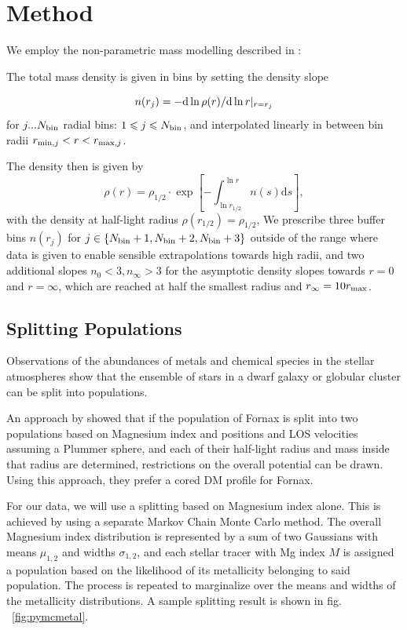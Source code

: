 \section{Method}\label{sec:method}
We employ the non-parametric mass modelling described in
:

The total mass density is given in bins by setting the density slope

\begin{equation}
n(r_j)=-{\rm d}\ln\rho(r)/{\rm d}\ln r|_{r=r_j}
\end{equation}
for $j ... N_{\rm bin}$ radial bins: $1\leq j\leq N_{\rm bin}$, and
interpolated linearly in between bin radii $r_{{\rm min},j}<r<r_{{\rm
    max},j}$.

The density then is given by
\begin{equation*}
    \rho(r) = \rho_{1/2}\cdot\exp\left[-\int_{\ln r_{1/2}}^{\ln r}n(s)\text{d}s\right],
\end{equation*}
with the density at half-light radius $\rho(r_{1/2})=\rho_{1/2}$, We
prescribe three buffer bins $n(r_j)$ for $j\in\{N_{\rm bin}+1,
N_{\rm bin}+2, N_{\rm bin}+3\}$ outside of the range where data is given to
enable sensible extrapolations towards high radii, and two additional slopes
$n_0 < 3, n_\infty>3$ for the asymptotic density slopes towards $r=0$ and
$r=\infty$, which are reached at half the smallest radius and $r_\infty=10r_{\rm
  max}$.


\subsection{Splitting Populations}\label{sec:metals}
Observations of the abundances of metals and chemical species in the
stellar atmospheres show that the ensemble of stars in a dwarf galaxy
or globular cluster can be split into populations.

An approach by \cite{WalkerPenarrubia2011} showed that if the
population of Fornax is split into two populations based on Magnesium
index and positions and LOS velocities assuming a Plummer sphere, and
each of their half-light radius and mass inside that radius are
determined, restrictions on the overall potential can be drawn. Using
this approach, they prefer a cored DM profile for Fornax.

For our data, we will use a splitting based on Magnesium index alone. This is
achieved by using a separate Markov Chain Monte Carlo method. The
overall Magnesium index distribution is represented by a sum of two
Gaussians with means $\mu_{1,2}$ and widths $\sigma_{1,2}$, and each
stellar tracer with Mg index $M$ is assigned a population based on
the likelihood of its metallicity belonging to said population. The
process is repeated to marginalize over the means and widths of the
metallicity distributions. A sample splitting result is shown in
fig. ~\ref{fig:pymcmetal}.

